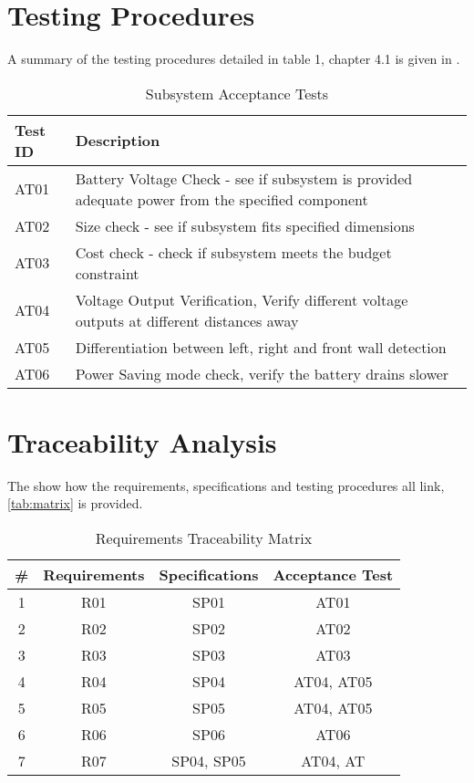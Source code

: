 \documentclass[class=report,11pt,crop=false]{standalone}
\begin{document}
\section{Testing Procedures}
A summary of the testing procedures detailed in table 1, chapter 4.1 is given in .
\begin{table}[h]
\centering
\caption{Subsystem Acceptance Tests}
\label{tab:tests}
\begin{tabular}{ |>{\centering\arraybackslash}m{5cm}| m{10cm}|}
\hline
\textbf{Test ID} & \textbf{Description} \\
\hline
AT01 & Battery Voltage Check - see if subsystem is provided adequate power from the specified component \\
\hline
AT02 & Size check - see if subsystem fits specified dimensions \\
\hline
AT03 & Cost check - check if subsystem meets the budget constraint \\
\hline
AT04 & Voltage Output Verification, Verify different voltage outputs at different distances away\\
\hline
AT05 & Differentiation between left, right and front wall detection\\
\hline
AT06 & Power Saving mode check, verify the battery drains slower  \\
\hline
\end{tabular}
\end{table}

\section{Traceability Analysis}
The show how the requirements, specifications and testing procedures all link, \autoref{tab:matrix} is provided.

\begin{table}[h]
    \centering
    \caption{Requirements Traceability Matrix}
    \label{tab:matrix}
    \begin{tabular}{|c|c|c|c|}
        \hline
        \# & Requirements & Specifications  & Acceptance Test\\
        \hline
         1 & R01 &  SP01 & AT01 \\
         2 & R02 & SP02 & AT02 \\
         3 & R03 & SP03 & AT03 \\
         4 & R04 & SP04 & AT04, AT05 \\
         5 & R05 & SP05 & AT04, AT05 \\
         6 & R06 & SP06 & AT06 \\
         7 & R07 & SP04, SP05 & AT04, AT \\
    \hline
    \end{tabular}
\end{table}
\end{document}
